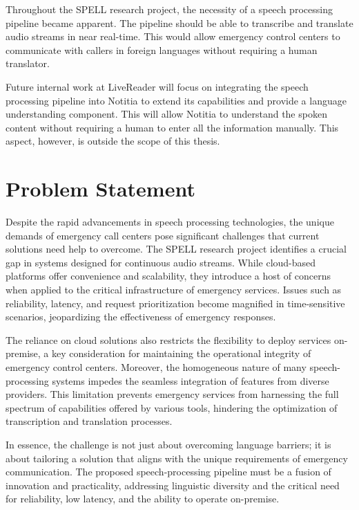 Throughout the SPELL research project, the necessity of a speech processing pipeline became apparent. The pipeline 
should be able to transcribe and translate audio streams in near real-time. This would allow emergency control centers 
to communicate with callers in foreign languages without requiring a human translator.

Future internal work at LiveReader will focus on integrating the speech processing pipeline into Notitia to extend its 
capabilities and provide a language understanding component. This will allow Notitia to understand the spoken content 
without requiring a human to enter all the information manually. This aspect, however, is outside the scope of this 
thesis.


\section{Problem Statement}

Despite the rapid advancements in speech processing technologies, the unique demands of emergency call centers pose 
significant challenges that current solutions need help to overcome. The SPELL research project identifies a crucial 
gap in systems designed for continuous audio streams. While cloud-based platforms offer convenience and 
scalability, they introduce a host of concerns when applied to the critical infrastructure of emergency services. 
Issues such as reliability, latency, and request prioritization become magnified in time-sensitive scenarios, 
jeopardizing the effectiveness of emergency responses.

The reliance on cloud solutions also restricts the flexibility to deploy services on-premise, a key consideration for 
maintaining the operational integrity of emergency control centers. Moreover, the homogeneous nature of many 
speech-processing systems impedes the seamless integration of features from diverse providers. This limitation prevents 
emergency services from harnessing the full spectrum of capabilities offered by various tools, hindering the 
optimization of transcription and translation processes.

In essence, the challenge is not just about overcoming language barriers; it is about tailoring a solution that aligns 
with the unique requirements of emergency communication. The proposed speech-processing pipeline must be a fusion of 
innovation and practicality, addressing linguistic diversity and the critical need for reliability, low 
latency, and the ability to operate on-premise.

